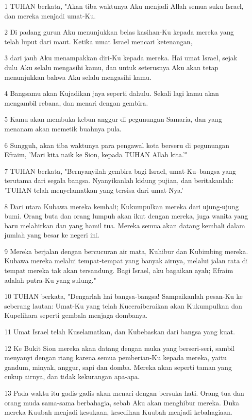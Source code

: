 \par 1 TUHAN berkata, "Akan tiba waktunya Aku menjadi Allah semua suku Israel, dan mereka menjadi umat-Ku.
\par 2 Di padang gurun Aku menunjukkan belas kasihan-Ku kepada mereka yang telah luput dari maut. Ketika umat Israel mencari ketenangan,
\par 3 dari jauh Aku menampakkan diri-Ku kepada mereka. Hai umat Israel, sejak dulu Aku selalu mengasihi kamu, dan untuk seterusnya Aku akan tetap menunjukkan bahwa Aku selalu mengasihi kamu.
\par 4 Bangsamu akan Kujadikan jaya seperti dahulu. Sekali lagi kamu akan mengambil rebana, dan menari dengan gembira.
\par 5 Kamu akan membuka kebun anggur di pegunungan Samaria, dan yang menanam akan memetik buahnya pula.
\par 6 Sungguh, akan tiba waktunya para pengawal kota berseru di pegunungan Efraim, 'Mari kita naik ke Sion, kepada TUHAN Allah kita.'"
\par 7 TUHAN berkata, "Bernyanyilah gembira bagi Israel, umat-Ku--bangsa yang terutama dari segala bangsa. Nyanyikanlah kidung pujian, dan beritakanlah: 'TUHAN telah menyelamatkan yang tersisa dari umat-Nya.'
\par 8 Dari utara Kubawa mereka kembali; Kukumpulkan mereka dari ujung-ujung bumi. Orang buta dan orang lumpuh akan ikut dengan mereka, juga wanita yang baru melahirkan dan yang hamil tua. Mereka semua akan datang kembali dalam jumlah yang besar ke negeri ini.
\par 9 Mereka berjalan dengan bercucuran air mata, Kuhibur dan Kubimbing mereka. Kubawa mereka melalui tempat-tempat yang banyak airnya, melalui jalan rata di tempat mereka tak akan tersandung. Bagi Israel, aku bagaikan ayah; Efraim adalah putra-Ku yang sulung."
\par 10 TUHAN berkata, "Dengarlah hai bangsa-bangsa! Sampaikanlah pesan-Ku ke seberang lautan: Umat-Ku yang telah Kuceraiberaikan akan Kukumpulkan dan Kupelihara seperti gembala menjaga dombanya.
\par 11 Umat Israel telah Kuselamatkan, dan Kubebaskan dari bangsa yang kuat.
\par 12 Ke Bukit Sion mereka akan datang dengan muka yang berseri-seri, sambil menyanyi dengan riang karena semua pemberian-Ku kepada mereka, yaitu gandum, minyak, anggur, sapi dan domba. Mereka akan seperti taman yang cukup airnya, dan tidak kekurangan apa-apa.
\par 13 Pada waktu itu gadis-gadis akan menari dengan bersuka hati. Orang tua dan orang muda sama-sama berbahagia, sebab Aku akan menghibur mereka. Duka mereka Kuubah menjadi kesukaan, kesedihan Kuubah menjadi kebahagiaan.
